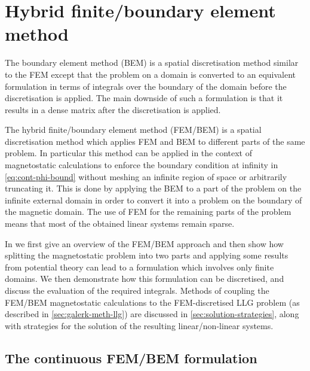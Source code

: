 \newcommand{\bmop}{\mathcal{G}}

\chapter{Hybrid finite/boundary element method}
\label{sec:hybr-finit-elem}

The boundary element method (BEM) is a spatial discretisation method similar to the FEM except that the problem on a domain is converted to an equivalent formulation in terms of integrals over the boundary of the domain before the discretisation is applied.
The main downside of such a formulation is that it results in a dense matrix after the discretisation is applied.

The hybrid finite/boundary element method (FEM/BEM) is a spatial discretisation method which applies FEM and BEM to different parts of the same problem.
In particular this method can be applied in the context of magnetostatic calculations to enforce the boundary condition at infinity in \cref{eq:cont-phi-bound} without meshing an infinite region of space or arbitrarily truncating it.
This is done by applying the BEM to a part of the problem on the infinite external domain in order to convert it into a problem on the boundary of the magnetic domain.
The use of FEM for the remaining parts of the problem means that most of the obtained linear systems remain sparse.

In  we first give an overview of the FEM/BEM approach and then show how splitting the magnetostatic problem into two parts and applying some results from potential theory can lead to a formulation which involves only finite domains.
We then demonstrate how this formulation can be discretised, and discuss the evaluation of the required integrals.
Methods of coupling the FEM/BEM magnetostatic calculations to the FEM-discretised LLG problem (as described in \cref{sec:galerk-meth-llg}) are discussed in \cref{sec:solution-strategies}, along with strategies for the solution of the resulting linear/non-linear systems.


\section{The continuous FEM/BEM formulation}
\label{sec:bem-derivation}




